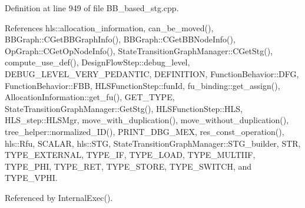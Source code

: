 Definition at line 949 of file B\+B\+\_\+based\+\_\+stg.\+cpp.



References hls\+::allocation\+\_\+information, can\+\_\+be\+\_\+moved(), B\+B\+Graph\+::\+C\+Get\+B\+B\+Graph\+Info(), B\+B\+Graph\+::\+C\+Get\+B\+B\+Node\+Info(), Op\+Graph\+::\+C\+Get\+Op\+Node\+Info(), State\+Transition\+Graph\+Manager\+::\+C\+Get\+Stg(), compute\+\_\+use\+\_\+def(), Design\+Flow\+Step\+::debug\+\_\+level, D\+E\+B\+U\+G\+\_\+\+L\+E\+V\+E\+L\+\_\+\+V\+E\+R\+Y\+\_\+\+P\+E\+D\+A\+N\+T\+IC, D\+E\+F\+I\+N\+I\+T\+I\+ON, Function\+Behavior\+::\+D\+FG, Function\+Behavior\+::\+F\+BB, H\+L\+S\+Function\+Step\+::fun\+Id, fu\+\_\+binding\+::get\+\_\+assign(), Allocation\+Information\+::get\+\_\+fu(), G\+E\+T\+\_\+\+T\+Y\+PE, State\+Transition\+Graph\+Manager\+::\+Get\+Stg(), H\+L\+S\+Function\+Step\+::\+H\+LS, H\+L\+S\+\_\+step\+::\+H\+L\+S\+Mgr, move\+\_\+with\+\_\+duplication(), move\+\_\+without\+\_\+duplication(), tree\+\_\+helper\+::normalized\+\_\+\+I\+D(), P\+R\+I\+N\+T\+\_\+\+D\+B\+G\+\_\+\+M\+EX, res\+\_\+const\+\_\+operation(), hls\+::\+Rfu, S\+C\+A\+L\+AR, hls\+::\+S\+TG, State\+Transition\+Graph\+Manager\+::\+S\+T\+G\+\_\+builder, S\+TR, T\+Y\+P\+E\+\_\+\+E\+X\+T\+E\+R\+N\+AL, T\+Y\+P\+E\+\_\+\+IF, T\+Y\+P\+E\+\_\+\+L\+O\+AD, T\+Y\+P\+E\+\_\+\+M\+U\+L\+T\+I\+IF, T\+Y\+P\+E\+\_\+\+P\+HI, T\+Y\+P\+E\+\_\+\+R\+ET, T\+Y\+P\+E\+\_\+\+S\+T\+O\+RE, T\+Y\+P\+E\+\_\+\+S\+W\+I\+T\+CH, and T\+Y\+P\+E\+\_\+\+V\+P\+HI.



Referenced by Internal\+Exec().

